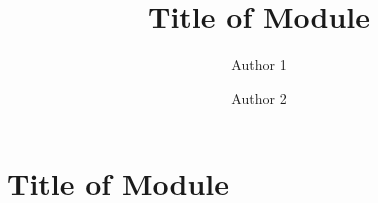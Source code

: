\documentclass{ximera}
\author{Author 1 \and Author 2} \title{Title of Module}
\begin{document}
\begin{abstract}
\end{abstract}
\maketitle 

\section{Title of Module}
\end{document}
